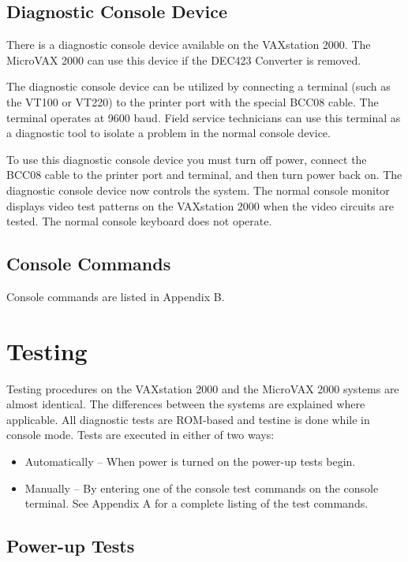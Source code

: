 \documentclass{decsectional}
\begin{document}
\subsection{Diagnostic Console Device}

There is a diagnostic console device available on the VAXstation 2000. The
MicroVAX 2000 can use this device if the DEC423 Converter is removed.

The diagnostic console device can be utilized by connecting a terminal (such
as the VT100 or VT220) to the printer port with the special BCC08 cable.
The terminal operates at 9600 baud. Field service technicians can use this
terminal as a diagnostic tool to isolate a problem in the normal console
device.

To use this diagnostic console device you must turn off power, connect the
BCC08 cable to the printer port and terminal, and then turn power back on.
The diagnostic console device now controls the system. The normal console
monitor displays video test patterns on the VAXstation 2000 when the video
circuits are tested. The normal console keyboard does not operate.

\subsection{Console Commands}

Console commands are listed in Appendix B.
\newpage
\section{Testing}

Testing procedures on the VAXstation 2000 and the MicroVAX 2000 systems
are almost identical. The differences between the systems are explained
where applicable. All diagnostic tests are ROM-based and testine is done
while in console mode. Tests are executed in either of two ways:

\begin{itemize}
\item Automatically -- When power is turned on the power-up tests begin.
\item Manually -- By entering one of the console test commands on the 
console terminal. See Appendix A for a complete listing of the test commands.
\end{itemize}

\subsection{Power-up Tests}
\end{document}
